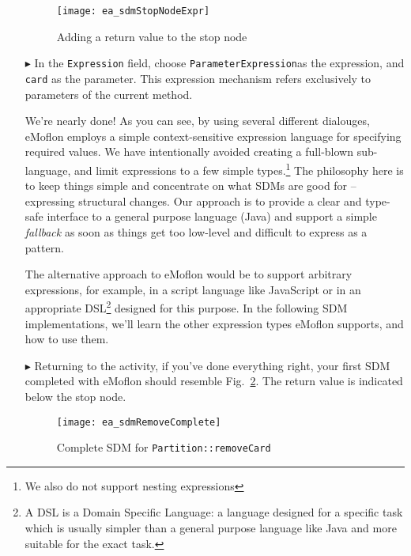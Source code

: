 \begin{itemize}
\begin{figure}[htbp]
\begin{center}
  \texttt{[image: ea\_sdmStopNodeExpr]}
  \caption{Adding a return value to the stop node}  
  \label{fig:stop_node_return_value}
\end{center}
\end{figure}

\item[$\blacktriangleright$] In the \texttt{Expression} field, choose \texttt{ParameterExpression}as the expression, and
\texttt{card} as the parameter. This expression mechanism refers exclusively to parameters of the current method.

\vspace{0.5cm}

We're nearly done! As you can see, by using several different dialouges, eMoflon employs a simple context-sensitive expression language for specifying required
values. We have intentionally avoided creating a full-blown sub-language, and limit expressions to a few simple types.\footnote{We also do not support nesting
expressions} The philosophy here is to keep things simple and concentrate on what SDMs are good for -- expressing structural changes. Our approach is to
provide a clear and type-safe interface to a general purpose language (Java) and support a simple \emph{fallback} as soon as things get too low-level and
difficult to express as a pattern.

The alternative approach to eMoflon would be to support arbitrary expressions, for example, in a script language like JavaScript or in an appropriate
DSL\footnote{A DSL is a Domain Specific Language: a language designed for a specific task which is usually simpler than a general purpose language like Java and
more suitable for the exact task.} designed for this purpose. In the following SDM implementations, we'll learn the other expression types eMoflon supports,
and how to use them. 

\item[$\blacktriangleright$] Returning to the activity, if you've done everything right, your first SDM completed with eMoflon should resemble
Fig.~\ref{fig:sdm_complete_control_flow}. The return value is indicated below the stop node.


\begin{figure}[htbp]
\begin{center}
  \texttt{[image: ea\_sdmRemoveComplete]}
  \caption{Complete SDM for \texttt{Partition::removeCard}}  
  \label{fig:sdm_complete_control_flow}
\end{center}
\end{figure}


\end{itemize}
